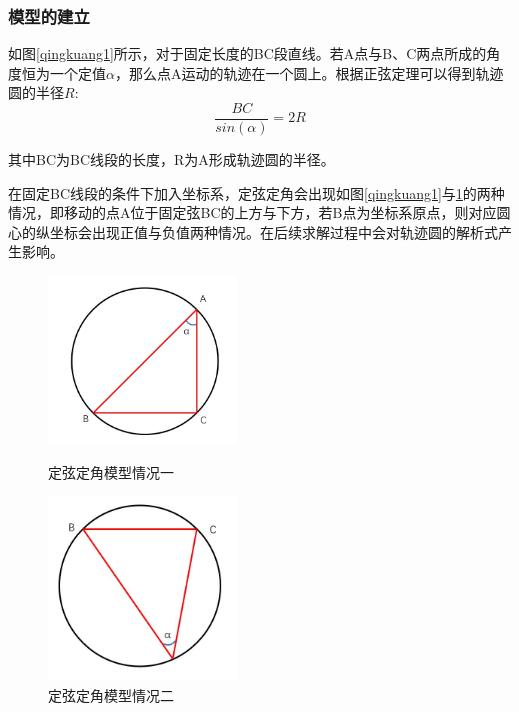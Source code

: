 \documentclass{my_paper}
\begin{document}
\subsubsection{模型的建立}

如图\ref{qingkuang1}所示，对于固定长度的BC段直线。若A点与B、C两点所成的角度恒为一个定值$\alpha$，那么点A运动的轨迹在一个圆上。根据正弦定理可以得到轨迹圆的半径$R$:
\begin{equation}
    \frac{BC}{sin(\alpha)} = 2R
\end{equation}

其中BC为BC线段的长度，R为A形成轨迹圆的半径。

在固定BC线段的条件下加入坐标系，定弦定角会出现如图\ref{qingkuang1}与\ref{qingkuang2}的两种情况，即移动的点A位于固定弦BC的上方与下方，若B点为坐标系原点，则对应圆心的纵坐标会出现正值与负值两种情况。在后续求解过程中会对轨迹圆的解析式产生影响。



\begin{figure}[htbp]
    \centering
    \begin{minipage}[t]{0.48\textwidth}
        \centering
        \includegraphics[width=5cm]{dingxiandingjiao.jpg}
        \caption{定弦定角模型情况一}
        \label{qingkuang1}
    \end{minipage}
    \begin{minipage}[t]{0.48\textwidth}
        \centering
        \includegraphics[width=5cm]{dingxiandingjiao2.jpg}
        \caption{定弦定角模型情况二}
        \label{qingkuang2}
    \end{minipage}
\end{figure}
\end{document}

